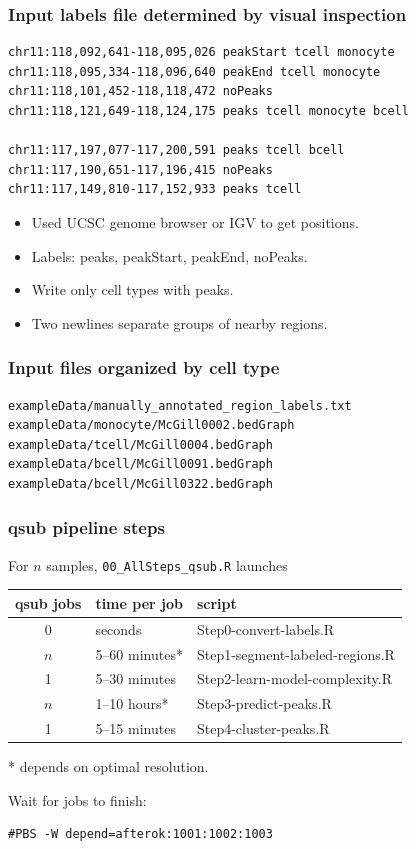 \documentclass{beamer}
\begin{document}
\begin{frame}[fragile]
  \frametitle{Input labels file determined by visual inspection}
\begin{verbatim}
chr11:118,092,641-118,095,026 peakStart tcell monocyte
chr11:118,095,334-118,096,640 peakEnd tcell monocyte
chr11:118,101,452-118,118,472 noPeaks
chr11:118,121,649-118,124,175 peaks tcell monocyte bcell

chr11:117,197,077-117,200,591 peaks tcell bcell
chr11:117,190,651-117,196,415 noPeaks
chr11:117,149,810-117,152,933 peaks tcell 
\end{verbatim}
\begin{itemize}
\item Used UCSC genome browser or IGV to get positions.
\item Labels: peaks, peakStart, peakEnd, noPeaks.
\item Write only cell types with peaks.
\item Two newlines separate groups of nearby regions.
\end{itemize}

\end{frame}

\begin{frame}[fragile]
  \frametitle{Input files organized by cell type}
\begin{verbatim}
exampleData/manually_annotated_region_labels.txt
exampleData/monocyte/McGill0002.bedGraph
exampleData/tcell/McGill0004.bedGraph  
exampleData/bcell/McGill0091.bedGraph  
exampleData/bcell/McGill0322.bedGraph
\end{verbatim}

\end{frame}

\begin{frame}[fragile]
  \frametitle{qsub pipeline steps}
  For $n$ samples, \texttt{00\_AllSteps\_qsub.R} launches
  \begin{tabular}{cll}
    qsub jobs & time per job & script \\
    \hline
    0 & seconds & Step0-convert-labels.R\\
    $n$ & 5--60 minutes* & Step1-segment-labeled-regions.R\\
    1 & 5--30 minutes & Step2-learn-model-complexity.R\\
    $n$ & 1--10 hours* & Step3-predict-peaks.R\\
    1 & 5--15 minutes & Step4-cluster-peaks.R
  \end{tabular}

* depends on optimal resolution.

\vskip 0.5cm

Wait for jobs to finish:
\begin{verbatim}
#PBS -W depend=afterok:1001:1002:1003
\end{verbatim}

\end{frame}
\end{document}
